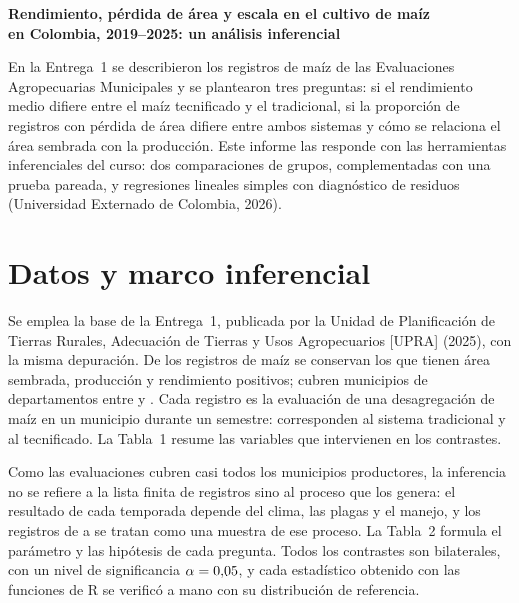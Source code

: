 \documentclass[12pt,letterpaper]{article}
\begin{document}



\begin{center}
\textbf{Rendimiento, pérdida de área y escala en el cultivo de maíz\\[2pt]
en Colombia, 2019--2025: un análisis inferencial}
\end{center}

En la Entrega~1 se describieron los registros de maíz de las Evaluaciones
Agropecuarias Municipales y se plantearon tres preguntas: si el rendimiento
medio difiere entre el maíz tecnificado y el tradicional, si la proporción de
registros con pérdida de área difiere entre ambos sistemas y cómo se relaciona
el área sembrada con la producción. Este informe las responde con las
herramientas inferenciales del curso: dos comparaciones de grupos,
complementadas con una prueba pareada, y regresiones lineales simples con
diagnóstico de residuos (Universidad Externado de Colombia, 2026).

\section{Datos y marco inferencial}

Se emplea la base de la Entrega~1, publicada por la Unidad de Planificación de
Tierras Rurales, Adecuación de Tierras y Usos Agropecuarios [UPRA] (2025), con
la misma depuración. De los \Nmaiz{} registros de maíz se conservan los
\Nfinal{} que tienen área sembrada, producción y rendimiento positivos; cubren
\Nmunicipios{} municipios de \Ndepartamentos{} departamentos entre \AnioMin{}
y \AnioMax. Cada registro es la evaluación de una desagregación de maíz en un
municipio durante un semestre: \NTrad{} corresponden al sistema tradicional y
\NTec{} al tecnificado. La Tabla~1 resume las variables que intervienen en los
contrastes.

Como las evaluaciones cubren casi todos los municipios productores, la
inferencia no se refiere a la lista finita de registros sino al proceso que
los genera: el resultado de cada temporada depende del clima, las plagas y el
manejo, y los registros de \AnioMin{} a \AnioMax{} se tratan como una muestra
de ese proceso. La Tabla~2 formula el parámetro y las hipótesis de cada
pregunta. Todos los contrastes son bilaterales, con un nivel de significancia
$\alpha = 0{,}05$, y cada estadístico obtenido con las funciones de R se
verificó a mano con su distribución de referencia.
\end{document}
